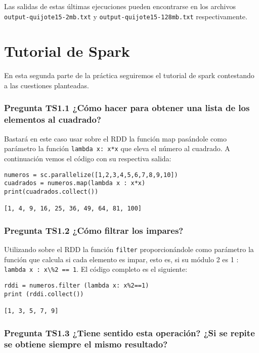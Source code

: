 \documentclass[11pt]{article}
\def\inline{\lstinline[basicstyle=\ttfamily,keywordstyle={}]}
\begin{document}
Las salidas de estas últimas ejecuciones pueden encontrarse en los archivos \inline{output-quijote15-2mb.txt} y \inline{output-quijote15-128mb.txt} respectivamente.


\newpage
\section{ Tutorial de Spark}


En esta segunda parte de la práctica seguiremos el tutorial de spark contestando a las cuestiones planteadas.


\subsubsection*{ Pregunta TS1.1 ¿Cómo hacer para obtener una lista de los elementos al cuadrado?}

Bastará en este caso usar sobre el RDD la función map pasándole como parámetro la función  \inline{lambda x: x*x} que eleva el número al cuadrado. 
A continuación vemos el código con su respectiva salida:

\begin{verbatim}
numeros = sc.parallelize([1,2,3,4,5,6,7,8,9,10])
cuadrados = numeros.map(lambda x : x*x)
print(cuadrados.collect())

[1, 4, 9, 16, 25, 36, 49, 64, 81, 100]
\end{verbatim}

\subsubsection*{ Pregunta TS1.2 ¿Cómo filtrar los impares? }

Utilizando sobre el RDD la función \inline{filter} proporcionándole como parámetro la función que calcula si cada elemento es impar, esto es, si su módulo 2 es 1 :  \inline{lambda x : x\%2 == 1}. El código completo es el siguiente:

\begin{verbatim}
rddi = numeros.filter (lambda x: x%2==1)
print (rddi.collect())

[1, 3, 5, 7, 9]
\end{verbatim}

\subsubsection*{ Pregunta TS1.3 ¿Tiene sentido esta operación? ¿Si se repite se obtiene siempre el mismo resultado?}
\end{document}
